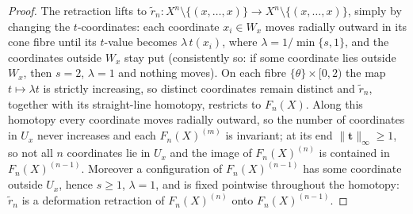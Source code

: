\documentclass[10pt,a4paper]{amsart}
\newcommand\bft{\mathbf{t}}
\renewcommand{\tilde}{\widetilde}
\begin{document}
\begin{proof}
The retraction lifts to
\(\tilde r_n\colon X^n\setminus\{(x,\dots,x)\}\to
X^n\setminus\{(x,\dots,x)\}\), simply by changing the
\(t\)-coordinates: each coordinate \(x_i\in W_x\) moves radially
outward in its cone fibre until its \(t\)-value becomes
\(\lambda\,t(x_i)\), where \(\lambda=1/\min\{s,1\}\), and the
coordinates outside \(W_x\) stay put (consistently so: if some
coordinate lies outside \(W_x\), then \(s=2\), \(\lambda=1\) and
nothing moves). On each fibre \(\{\theta\}\times[0,2)\) the map
\(t\mapsto\lambda t\) is strictly increasing, so distinct
coordinates remain distinct and \(\tilde r_n\), together with
its straight-line homotopy, restricts to \(F_n(X)\). Along this
homotopy every coordinate moves radially outward, so the number
of coordinates in \(U_x\) never increases and each
\(F_n(X)^{(m)}\) is invariant; at its end
\(\|\bft\|_\infty\ge1\), so not all \(n\) coordinates lie in
\(U_x\) and the image of \(F_n(X)^{(n)}\) is contained in
\(F_n(X)^{(n-1)}\). Moreover a configuration of
\(F_n(X)^{(n-1)}\) has some coordinate outside \(U_x\), hence
\(s\ge1\), \(\lambda=1\), and is fixed pointwise throughout the
homotopy: \(\tilde r_n\) is a deformation retraction of
\(F_n(X)^{(n)}\) onto \(F_n(X)^{(n-1)}\).


\end{proof}
\end{document}
